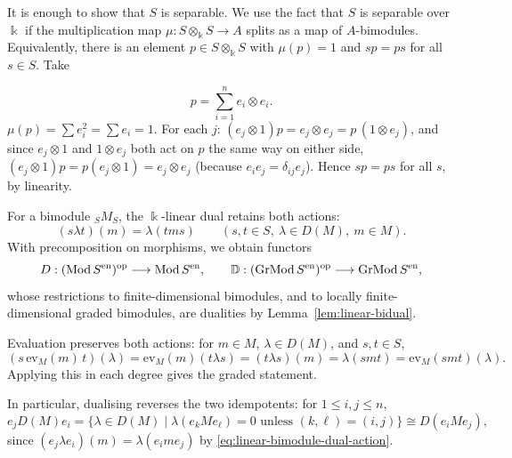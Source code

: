 \begin{advanced}
It is enough to show that $S$ is separable.  We use the fact that $S$ is separable over $\Bbbk$ if the multiplication map $\mu: S \otimes_\Bbbk S \to A$ splits as a map of $A$-bimodules. Equivalently, there is an element $p \in S \otimes_\Bbbk S$ with $\mu(p) = 1$ and $s p = p s$ for all $s \in S$. Take


$$p = \sum_{i=1}^n e_i \otimes e_i.$$
$\mu(p) = \sum e_i^2 = \sum e_i = 1$.
For each $j$: $(e_j \otimes 1)p = e_j \otimes e_j = p\,(1 \otimes e_j)$, and since $e_j \otimes 1$ and $1 \otimes e_j$ both act on $p$ the same way on either side, $(e_j\otimes 1)p = p(e_j\otimes 1) = e_j \otimes e_j$ (because $e_i e_j = \delta_{ij} e_j$). Hence $sp = ps$ for all $s$, by linearity.
\end{advanced}

For a bimodule ${}_SM_S$, the $\Bbbk$-linear dual retains both actions:
\begin{equation}\label{eq:linear-bimodule-dual-action}
(s\lambda t)(m)=\lambda(tms)\qquad(s,t\in S,\ \lambda\in D(M),\ m\in M).
\end{equation}
With precomposition on morphisms, we obtain functors
\[
D:(\operatorname{\mathrm{Mod}} S^{\mathrm{en}})^{\mathrm{op}}\longrightarrow\operatorname{\mathrm{Mod}} S^{\mathrm{en}},\qquad
\mathbb{D}:(\operatorname{\mathrm{GrMod}} S^{\mathrm{en}})^{\mathrm{op}}\longrightarrow\operatorname{\mathrm{GrMod}} S^{\mathrm{en}},
\]
whose restrictions to finite-dimensional bimodules, and to locally finite-dimensional graded bimodules, are dualities by Lemma~\ref{lem:linear-bidual}.
\begin{supplementary}
Evaluation preserves both actions: for $m\in M$, $\lambda\in D(M)$, and $s,t\in S$,
\[
(s\,\mathrm{ev}_M(m)\,t)(\lambda)=\mathrm{ev}_M(m)(t\lambda s)=(t\lambda s)(m)=\lambda(smt)=\mathrm{ev}_M(smt)(\lambda).
\]
Applying this in each degree gives the graded statement.
\end{supplementary}

In particular, dualising reverses the two idempotents: for $1\leq i,j\leq n$,
\begin{equation}\label{eq:dual-blocks}
e_jD(M)e_i=\{\lambda\in D(M)\mid\lambda(e_kMe_\ell)=0\text{ unless }(k,\ell)=(i,j)\}\cong D(e_iMe_j),
\end{equation}
since $(e_j\lambda e_i)(m)=\lambda(e_ime_j)$ by \eqref{eq:linear-bimodule-dual-action}.


